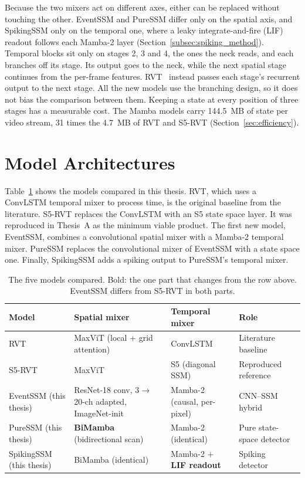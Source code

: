 \documentclass[11pt, a4paper]{report}
\begin{document}
Because the two mixers act on different axes, either can be replaced without touching the other. EventSSM
and PureSSM differ only on the spatial axis, and SpikingSSM only on the temporal one, where a leaky
integrate-and-fire (LIF) readout follows each Mamba-2 layer (Section~\ref{subsec:spiking_method}). Temporal
blocks sit only on stages 2, 3 and 4, the ones the neck reads, and each branches off its stage. Its output goes to the neck, while the next spatial stage continues from the per-frame features.
RVT~\cite{gehrig2023recurrent} instead passes each stage's recurrent output to the next stage. All the new
models use the branching design, so it does not bias the comparison between them. Keeping a state at every
position of three stages has a measurable cost. The Mamba models carry 144.5~MB of state per video stream,
31 times the 4.7~MB of RVT and S5-RVT (Section~\ref{sec:efficiency}).
\newpage
\section{Model Architectures}
\label{sec:models}
Table~\ref{tab:four_models} shows the models compared in this thesis. RVT, which uses a ConvLSTM temporal
mixer to process time, is the original baseline from the literature. S5-RVT replaces the ConvLSTM with an S5 state space layer. It was reproduced in Thesis~A as the minimum viable product. The first new model,
EventSSM, combines a convolutional spatial mixer with a Mamba-2 temporal mixer. PureSSM replaces the
convolutional mixer of EventSSM with a state space one. Finally, SpikingSSM adds a spiking output to
PureSSM's temporal mixer.

\begin{table}[htbp]
\centering
\caption[The five models compared]{The five models compared. Bold: the one part that changes from the row above. EventSSM differs from S5-RVT
    in both parts.}
\label{tab:four_models}
\begin{tabularx}{\textwidth}{@{}l>{\raggedright\arraybackslash}X>{\raggedright\arraybackslash}X>{\raggedright\arraybackslash}X@{}}
\toprule
\textbf{Model} & \textbf{Spatial mixer} & \textbf{Temporal mixer} & \textbf{Role} \\
\midrule
RVT & MaxViT (local + grid attention) & ConvLSTM & Literature baseline \\
S5-RVT & MaxViT & S5 (diagonal SSM) & Reproduced reference \\
EventSSM (this thesis) & ResNet-18 conv, 3$\to$20-ch adapted, ImageNet-init & Mamba-2 (causal, per-pixel) & CNN--SSM hybrid \\
PureSSM (this thesis) & \textbf{BiMamba} (bidirectional scan) & Mamba-2 (identical) & Pure state-space detector \\
SpikingSSM (this thesis) & BiMamba (identical) & Mamba-2 $+$ \textbf{LIF readout} & Spiking detector \\
\bottomrule
\end{tabularx}
\end{table}
\end{document}
